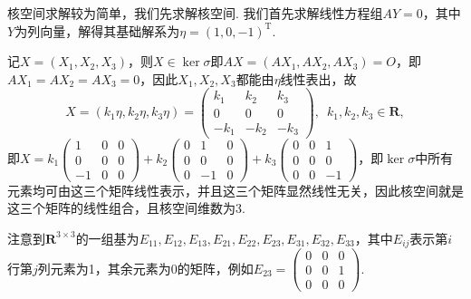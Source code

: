 \begin{solution}
    核空间求解较为简单，我们先求解核空间. 我们首先求解线性方程组$AY=0$，其中$Y$为列向量，解得其基础解系为$\eta=(1,0,-1)^\mathrm{T}$.

    记$X=(X_1,X_2,X_3)$，则$X\in\ker\sigma$即$AX=(AX_1,AX_2,AX_3)=O$，即$AX_1=AX_2=AX_3=0$，因此$X_1,X_2,X_3$都能由$\eta$线性表出，故
    \[X=(k_1\eta,k_2\eta,k_3\eta)=\begin{pmatrix}
            k_1 & k_2 & k_3 \\ 0 & 0 & 0 \\ -k_1 & -k_2 & -k_3
        \end{pmatrix},\enspace k_1,k_2,k_3\in\mathbf{R},\]
    即$X=k_1\begin{pmatrix}
            1 & 0 & 0 \\ 0 & 0 & 0 \\ -1 & 0 & 0
        \end{pmatrix}+k_2\begin{pmatrix}
            0 & 1 & 0 \\ 0 & 0 & 0 \\ 0 & -1 & 0
        \end{pmatrix}+k_3\begin{pmatrix}
            0 & 0 & 1 \\ 0 & 0 & 0 \\ 0 & 0 & -1
        \end{pmatrix}$，即$\ker\sigma$中所有元素均可由这三个矩阵线性表示，并且这三个矩阵显然线性无关，因此核空间就是这三个矩阵的线性组合，且核空间维数为3.

    注意到$\mathbf{R}^{3 \times 3}$的一组基为$E_{11},E_{12},E_{13},E_{21},E_{22},E_{23},E_{31},E_{32},E_{33}$，其中$E_{ij}$表示第$i$行第$j$列元素为1，其余元素为0的矩阵，例如$E_{23}=\begin{pmatrix}
            0 & 0 & 0 \\ 0 & 0 & 1 \\ 0 & 0 & 0
        \end{pmatrix}$.


\end{solution}
